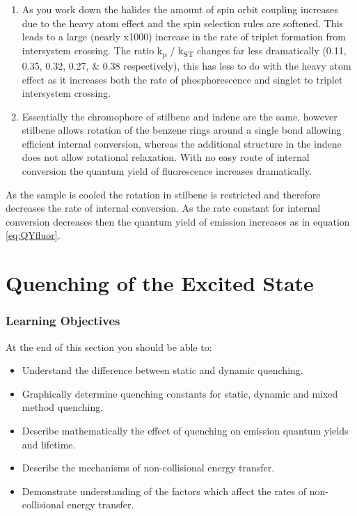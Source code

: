 \documentclass[
]{book}
\providecommand{\tightlist}{%
  \setlength{\itemsep}{0pt}\setlength{\parskip}{0pt}}
\begin{document}
\begin{enumerate}
\def\labelenumi{\arabic{enumi}.}
\setcounter{enumi}{5}
\item
  As you work down the halides the amount of spin orbit coupling increases due to the heavy atom effect and the spin selection rules are softened. This leads to a large (nearly x1000) increase in the rate of triplet formation from intersystem crossing. The ratio k\textsubscript{p} / k\textsubscript{ST} changes far less dramatically (0.11, 0.35, 0.32, 0.27, \& 0.38 respectively), this has less to do with the heavy atom effect as it increases both the rate of phosphorescence and singlet to triplet intersystem crossing.
\item
  Essentially the chromophore of stilbene and indene are the same, however stilbene allows rotation of the benzene rings around a single bond allowing efficient internal conversion, whereas the additional structure in the indene does not allow rotational relaxation. With no easy route of internal conversion the quantum yield of fluorescence increases dramatically.
\end{enumerate}

As the sample is cooled the rotation in stilbene is restricted and therefore decreases the rate of internal conversion. As the rate constant for internal conversion decreases then the quantum yield of emission increases as in equation \eqref{eq:QYfluor}.

\hypertarget{ch:Quench}{%
\chapter{Quenching of the Excited State}\label{ch:Quench}}

\hypertarget{sec:QuenchLOs}{%
\subsection{Learning Objectives}\label{sec:QuenchLOs}}

At the end of this section you should be able to:

\begin{itemize}
\tightlist
\item
  Understand the difference between static and dynamic quenching.
\item
  Graphically determine quenching constants for static, dynamic and mixed method quenching.
\item
  Describe mathematically the effect of quenching on emission quantum yields and lifetime.
\item
  Describe the mechanisms of non-collisional energy transfer.
\item
  Demonstrate understanding of the factors which affect the rates of non-collisional energy transfer.
\end{itemize}
\end{document}
